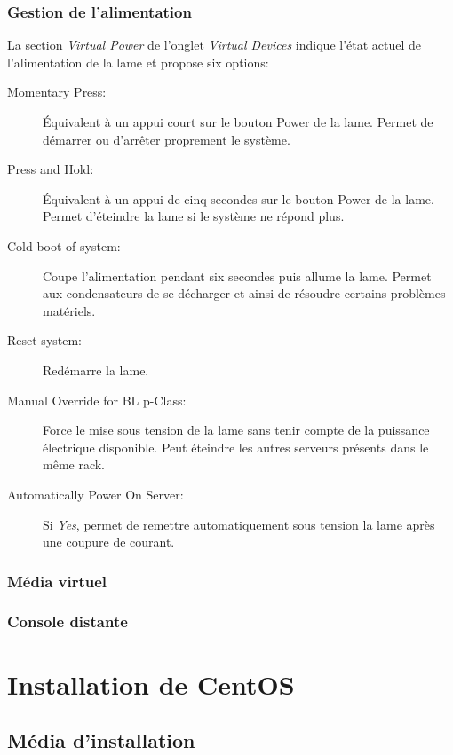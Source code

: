 \documentclass[a4paper,oneside]{report}
\begin{document}
\subsubsection{Gestion de l'alimentation}
La section \emph{Virtual Power} de l'onglet \emph{Virtual Devices} indique l'état actuel de l'alimentation de la lame et propose six options:
\begin{description}
\item[Momentary Press:] Équivalent à un appui court sur le bouton Power de la lame.
Permet de démarrer ou d'arrêter proprement le système.
\item[Press and Hold:] Équivalent à un appui de cinq secondes sur le bouton Power de la lame.
Permet d'éteindre la lame si le système ne répond plus.
\item[Cold boot of system:] Coupe l'alimentation pendant six secondes puis allume la lame.
Permet aux condensateurs de se décharger et ainsi de résoudre certains problèmes matériels.
\item[Reset system:] Redémarre la lame.
\item[Manual Override for BL p-Class:] Force le mise sous tension de la lame sans tenir compte de la puissance électrique disponible.
Peut éteindre les autres serveurs présents dans le même rack.
\item[Automatically Power On Server:] Si \emph{Yes}, permet de remettre automatiquement sous tension la lame après une coupure de courant.
\end{description}

\subsubsection{Média virtuel}

\subsubsection{Console distante}

\section{Installation de CentOS} \label{sec:installcentos}
\subsection{Média d'installation} \label{sec:installmediacentos}
\end{document}
